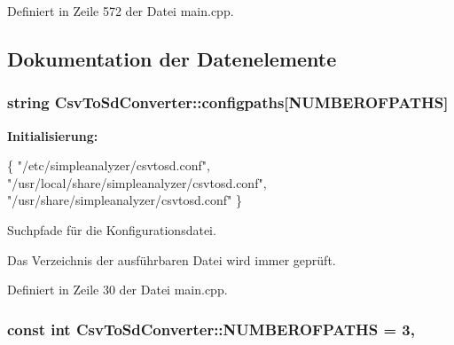 Definiert in Zeile 572 der Datei main.\-cpp.



\subsection{Dokumentation der Datenelemente}
\hypertarget{classCsvToSdConverter_a185377b44506f75748a4d56bc372ee50}{
\subsubsection[{configpaths}]{\setlength{\rightskip}{0pt plus 5cm}string Csv\-To\-Sd\-Converter\-::configpaths\mbox{[}{\bf N\-U\-M\-B\-E\-R\-O\-F\-P\-A\-T\-H\-S}\mbox{]}\hspace{0.3cm}{\ttfamily [protected]}}}\label{classCsvToSdConverter_a185377b44506f75748a4d56bc372ee50}
{\bfseries Initialisierung\-:}
\begin{DoxyCode}
\{
            \textcolor{stringliteral}{"/etc/simpleanalyzer/csvtosd.conf"},
            \textcolor{stringliteral}{"/usr/local/share/simpleanalyzer/csvtosd.conf"},
            \textcolor{stringliteral}{"/usr/share/simpleanalyzer/csvtosd.conf"} \}
\end{DoxyCode}


Suchpfade für die Konfigurationsdatei. 

Das Verzeichnis der ausführbaren Datei wird immer geprüft. 

Definiert in Zeile 30 der Datei main.\-cpp.

\hypertarget{classCsvToSdConverter_ad2278682506407d3172e8fca834891fe}{
\subsubsection[{N\-U\-M\-B\-E\-R\-O\-F\-P\-A\-T\-H\-S}]{\setlength{\rightskip}{0pt plus 5cm}const int Csv\-To\-Sd\-Converter\-::\-N\-U\-M\-B\-E\-R\-O\-F\-P\-A\-T\-H\-S = 3\hspace{0.3cm}{\ttfamily [static]}, {\ttfamily [protected]}}}\label{classCsvToSdConverter_ad2278682506407d3172e8fca834891fe}


